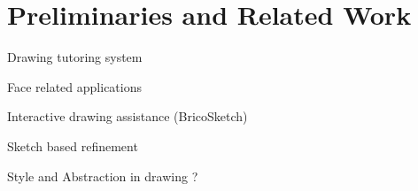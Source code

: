 \chapter{Preliminaries and Related Work}\label{sec-preliminaries}

Drawing tutoring system

Face related applications

Interactive drawing assistance (BricoSketch)
		

Sketch based refinement

Style and Abstraction in drawing ?


%
%
%
%
%
%
%
%
%
